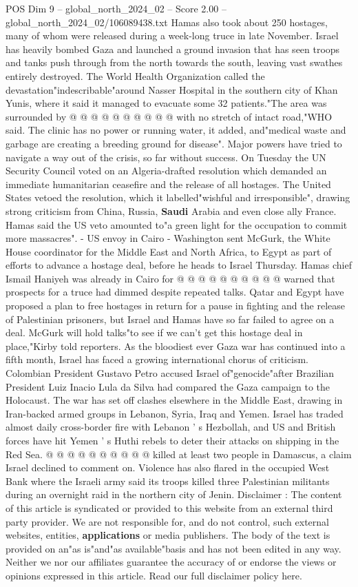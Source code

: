 \begin{textsample}{POS Dim 9 – global\_north\_2024\_02 – Score 2.00 – global\_north\_2024\_02/106089438.txt}
Hamas also took about 250 hostages, many of whom were released during a week-long truce in late November.
Israel has heavily bombed Gaza and launched a ground invasion that has seen troops and tanks push through from the north towards the south, leaving vast swathes entirely destroyed.
The World Health Organization called the devastation"indescribable"around Nasser Hospital in the southern city of Khan Yunis, where it said it managed to evacuate some 32 patients."The area was surrounded by @ @ @ @ @ @ @ @ @ @ with no stretch of intact road,"WHO said.
The clinic has no power or running water, it added, and"medical waste and garbage are creating a breeding ground for disease".
Major powers have tried to navigate a way out of the crisis, so far without success.
On Tuesday the UN Security Council voted on an Algeria-drafted resolution which demanded an immediate humanitarian ceasefire and the release of all hostages.
The United States vetoed the resolution, which it labelled"wishful and irresponsible", drawing strong criticism from China, Russia, \textbf{Saudi} Arabia and even close ally France.
Hamas said the US veto amounted to"a green light for the occupation to commit more massacres". - US envoy in Cairo - Washington sent McGurk, the White House coordinator for the Middle East and North Africa, to Egypt as part of efforts to advance a hostage deal, before he heads to Israel Thursday.
Hamas chief Ismail Haniyeh was already in Cairo for @ @ @ @ @ @ @ @ @ @ warned that prospects for a truce had dimmed despite repeated talks.
Qatar and Egypt have proposed a plan to free hostages in return for a pause in fighting and the release of Palestinian prisoners, but Israel and Hamas have so far failed to agree on a deal.
McGurk will hold talks"to see if we can't get this hostage deal in place,"Kirby told reporters.
As the bloodiest ever Gaza war has continued into a fifth month, Israel has faced a growing international chorus of criticism.
Colombian President Gustavo Petro accused Israel of"genocide"after Brazilian President Luiz Inacio Lula da Silva had compared the Gaza campaign to the Holocaust.
The war has set off clashes elsewhere in the Middle East, drawing in Iran-backed armed groups in Lebanon, Syria, Iraq and Yemen.
Israel has traded almost daily cross-border fire with Lebanon ' s Hezbollah, and US and British forces have hit Yemen ' s Huthi rebels to deter their attacks on shipping in the Red Sea. @ @ @ @ @ @ @ @ @ @ killed at least two people in Damascus, a claim Israel declined to comment on.
Violence has also flared in the occupied West Bank where the Israeli army said its troops killed three Palestinian militants during an overnight raid in the northern city of Jenin.
Disclaimer : The content of this article is syndicated or provided to this website from an external third party provider.
We are not responsible for, and do not control, such external websites, entities, \textbf{applications} or media publishers.
The body of the text is provided on an"as is"and"as available"basis and has not been edited in any way.
Neither we nor our affiliates guarantee the accuracy of or endorse the views or opinions expressed in this article.
Read our full disclaimer policy here.


\end{textsample}
